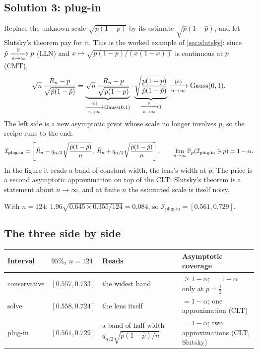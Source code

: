 \subsection*{Solution 3: plug-in}

Replace the unknown scale $\sqrt{p(1-p)}$ by its estimate $\sqrt{\hat{p}(1 - \hat{p})}$, and let Slutsky's theorem pay for it.
This is the worked example of \cref{sec:slutsky}: since $\hat{p} \xrightarrow [n \to \infty ]{\mathbb{P}} p$ (LLN) and $x \mapsto \sqrt{p(1-p)/(x(1-x))}$ is continuous at $p$ (CMT),
\[
\sqrt{n} \, \frac{\bar{R}_n - p}{\sqrt{\hat{p}(1 - \hat{p})}}
= \underbrace{\sqrt{n} \, \frac{\bar{R}_n - p}{\sqrt{p(1-p)}}}_{\xrightarrow [n \to \infty ]{\text{(d)}} \text{Gauss}(0,1)} \cdot \underbrace{\sqrt{\frac{p(1-p)}{\hat{p}(1-\hat{p})}}}_{\xrightarrow [n \to \infty ]{\mathbb{P}} 1} \xrightarrow [n \to \infty ]{\text{(d)}} \text{Gauss}(0,1).
\]
The left side is a new asymptotic pivot whose scale no longer involves $p$, so the recipe runs to the end:
\[
\mathcal{I}_{\text{plug-in}} = \left[ \bar{R}_n - q_{\alpha/2} \sqrt{\frac{\hat{p}(1-\hat{p})}{n}}, \; \bar{R}_n + q_{\alpha/2} \sqrt{\frac{\hat{p}(1-\hat{p})}{n}} \right],
\qquad \lim_{n \to \infty} \mathbb{P}_p(\mathcal{I}_{\text{plug-in}} \ni p) = 1 - \alpha.
\]
In the figure it reads a band of constant width, the lens's width at $\hat{p}$.
The price is a second asymptotic approximation on top of the CLT: Slutsky's theorem is a statement about $n \to \infty$, and at finite $n$ the estimated scale is itself noisy.

With $n = 124$: $1.96 \sqrt{0.645 \times 0.355/124} = 0.084$, so $\mathcal{I}_{\text{plug-in}} = [0.561, 0.729]$.

\subsection*{The three side by side}

\begin{center}
\begin{tabular}{@{}ll>{\raggedright\arraybackslash}p{3.6cm}>{\raggedright\arraybackslash}p{4.6cm}@{}}
\toprule
Interval & $95\%$, $n = 124$ & Reads & Asymptotic coverage \\
\midrule
conservative & $[0.557, 0.733]$ & the widest band & $\geq 1 - \alpha$; $= 1 - \alpha$ only at $p = \frac12$ \\[2pt]
solve & $[0.558, 0.724]$ & the lens itself & $= 1 - \alpha$; one approximation (CLT) \\[2pt]
plug-in & $[0.561, 0.729]$ & a band of half-width $q_{\alpha/2}\sqrt{\hat{p}(1-\hat{p})/n}$ & $= 1 - \alpha$; two approximations (CLT, Slutsky) \\
\bottomrule
\end{tabular}
\end{center}

